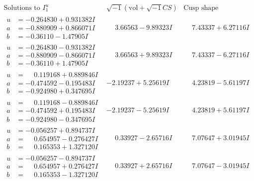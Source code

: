 \documentclass[1p]{elsarticle_modified}
\theoremstyle{definition}
\newcommand{\I}{\sqrt{-1}}
\begin{document}
$$\begin{array}{c|c|c}  
\text{Solutions to }I^u_{1}& \I (\text{vol} + \sqrt{-1}CS) & \text{Cusp shape}\\
 \hline 
\begin{aligned}
u &= -0.264830 + 0.931382 I \\
a &= -0.880909 + 0.866071 I \\
b &= -0.36110 - 1.47905 I\end{aligned}
 & \phantom{-}3.66563 - 9.89323 I & \phantom{-}7.43337 + 6.27116 I \\ \hline\begin{aligned}
u &= -0.264830 - 0.931382 I \\
a &= -0.880909 - 0.866071 I \\
b &= -0.36110 + 1.47905 I\end{aligned}
 & \phantom{-}3.66563 + 9.89323 I & \phantom{-}7.43337 - 6.27116 I \\ \hline\begin{aligned}
u &= \phantom{-}0.119168 + 0.889846 I \\
a &= -0.474592 - 0.195483 I \\
b &= -0.924980 + 0.347695 I\end{aligned}
 & -2.19237 + 5.25619 I & \phantom{-}4.23819 - 5.61197 I \\ \hline\begin{aligned}
u &= \phantom{-}0.119168 - 0.889846 I \\
a &= -0.474592 + 0.195483 I \\
b &= -0.924980 - 0.347695 I\end{aligned}
 & -2.19237 - 5.25619 I & \phantom{-}4.23819 + 5.61197 I \\ \hline\begin{aligned}
u &= -0.056257 + 0.894737 I \\
a &= \phantom{-}0.654957 - 0.276427 I \\
b &= \phantom{-}0.165353 + 1.327120 I\end{aligned}
 & \phantom{-}0.33927 - 2.65716 I & \phantom{-}7.07647 + 3.01945 I \\ \hline\begin{aligned}
u &= -0.056257 - 0.894737 I \\
a &= \phantom{-}0.654957 + 0.276427 I \\
b &= \phantom{-}0.165353 - 1.327120 I\end{aligned}
 & \phantom{-}0.33927 + 2.65716 I & \phantom{-}7.07647 - 3.01945 I \\ \hline\begin{aligned}

\end{aligned}
\end{array}$$
\end{document}
